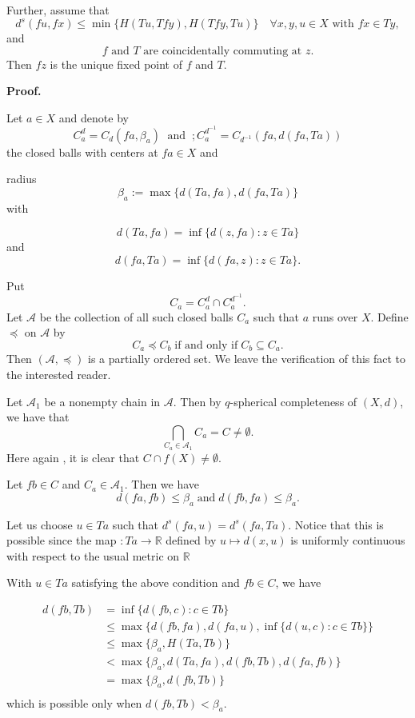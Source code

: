 \documentclass[10pt,a4paper]{article}
\begin{document}
{Further, assume that 
\begin{equation}\label{8}
d^s(fu,fx) \leq \min\{H(Tu,Tfy), H(Tfy,Tu)\} \quad \forall x,y,u\in X \text{ with } fx\in Ty,
\end{equation}
and
 \begin{equation}\label{10}
 f \text{ and } T \text{ are coincidentally commuting at } z.
 \end{equation} 
Then $fz$ is the unique fixed point of $f$ and $T$.

{\bf Proof.}

Let $a\in X$ and denote by \[ C^d_a=C_d(fa,\beta_a)\; \text{ and }\ ; C^{d^{-1}}_a = C_{d^{-1}}(fa,d(fa,Ta)) \] the closed balls with centers at $fa\in X$ and 

radius $$\beta_a:=\max\{d(Ta,fa),d(fa,Ta)\}$$   with 

$$d(Ta,fa)=\inf\lbrace d(z,fa):z\in Ta\rbrace$$ and $$d(fa,Ta)=\inf\lbrace d(fa,z):z\in Ta\rbrace .$$

 Put\[ C_a= C^d_a\cap C^{d^{-1}}_a.\] Let $\mathcal{A}$ be the collection of all such closed balls $C_a$ such that $a$ runs over $X$. Define $\preceq$ on $\mathcal{A}$ by \[ C_a\preceq C_b\; \text{if and only if}\; C_b\subseteq C_a.\] Then $(\mathcal{A},\preceq)$ is a partially ordered set. We leave the verification of this fact to the interested reader.

Let $\mathcal{A}_1$ be a nonempty chain in $\mathcal{A}$. Then by $q$-spherical completeness of $(X,d)$, we have that \[ \bigcap_{C_a\in \mathcal{A}_1}C_a=C\neq \emptyset.\]
Here again , it is clear that  $C\cap f(X) \neq \emptyset$.

Let $fb\in C$ and $C_a\in \mathcal{A}_1$. Then we have \[d(fa,fb)\leq \beta_a \; \text{and}\; d(fb,fa)\leq \beta_a. \]

Let us choose $u\in Ta$ such that $d^s(fa,u)=d^s(fa,Ta).$ Notice that this is possible since the map $:Ta\to \mathbb{R}$ defined by $u\mapsto d(x,u)$ is uniformly continuous with respect to the usual metric on $\mathbb{R}$

With $u\in Ta$ satisfying the above condition and $fb\in C$, we have

\begin{align*}
d(fb,Tb)&= \inf\lbrace d(fb,c):c\in Tb\rbrace \\
&\leq \max\lbrace d(fb,fa),d(fa,u),\inf\lbrace d(u,c):c\in Tb\rbrace \rbrace \\
&\leq \max\lbrace \beta_a, H(Ta,Tb) \rbrace \\
&< \max\lbrace \beta_a, d(Ta,fa),d(fb,Tb),d(fa,fb) \rbrace \\
&= \max\lbrace \beta_a, d(fb,Tb)\rbrace \\
\end{align*}
which is possible only when $d(fb,Tb)<\beta_a.$

}
\end{document}
